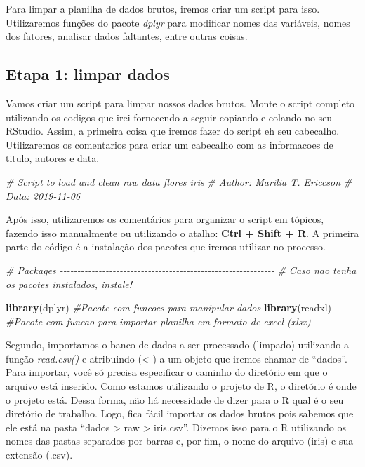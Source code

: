 \documentclass[
]{book}
\newenvironment{Shaded}{\begin{snugshade}}{\end{snugshade}}
\newcommand{\CommentTok}[1]{\textcolor[rgb]{0.56,0.35,0.01}{\textit{#1}}}
\newcommand{\FunctionTok}[1]{\textcolor[rgb]{0.13,0.29,0.53}{\textbf{#1}}}
\newcommand{\NormalTok}[1]{#1}
\begin{document}
Para limpar a planilha de dados brutos, iremos criar um script para isso. Utilizaremos funções do pacote \emph{dplyr} para modificar nomes das variáveis, nomes dos fatores, analisar dados faltantes, entre outras coisas.

\hypertarget{etapa-1-limpar-dados}{%
\subsection{Etapa 1: limpar dados}\label{etapa-1-limpar-dados}}

Vamos criar um script para limpar nossos dados brutos. Monte o script completo utilizando os codigos que irei fornecendo a seguir copiando e colando no seu RStudio. Assim, a primeira coisa que iremos fazer do script eh seu cabecalho. Utilizaremos os comentarios para criar um cabecalho com as informacoes de titulo, autores e data.

\begin{Shaded}
\begin{Highlighting}[]

\CommentTok{\# Script to load and clean raw data flores iris}
\CommentTok{\# Author: Marilia T. Ericcson}
\CommentTok{\# Data: 2019{-}11{-}06}
\end{Highlighting}
\end{Shaded}

Após isso, utilizaremos os comentários para organizar o script em tópicos, fazendo isso manualmente ou utilizando o atalho: \textbf{Ctrl + Shift + R}. A primeira parte do código é a instalação dos pacotes que iremos utilizar no processo.

\begin{Shaded}
\begin{Highlighting}[]

\CommentTok{\# Packages {-}{-}{-}{-}{-}{-}{-}{-}{-}{-}{-}{-}{-}{-}{-}{-}{-}{-}{-}{-}{-}{-}{-}{-}{-}{-}{-}{-}{-}{-}{-}{-}{-}{-}{-}{-}{-}{-}{-}{-}{-}{-}{-}{-}{-}{-}{-}{-}{-}{-}{-}{-}{-}{-}{-}{-}{-}{-}{-}{-}{-}}
\CommentTok{\# Caso nao tenha os pacotes instalados, instale!}

\FunctionTok{library}\NormalTok{(dplyr)  }\CommentTok{\#Pacote com funcoes para manipular dados}
\FunctionTok{library}\NormalTok{(readxl) }\CommentTok{\#Pacote com funcao para importar planilha em formato de excel (xlsx)}
\end{Highlighting}
\end{Shaded}

Segundo, importamos o banco de dados a ser processado (limpado) utilizando a função \emph{read.csv()} e atribuindo (\textless-) a um objeto que iremos chamar de ``dados''. Para importar, você só precisa especificar o caminho do diretório em que o arquivo está inserido. Como estamos utilizando o projeto de R, o diretório é onde o projeto está. Dessa forma, não há necessidade de dizer para o R qual é o seu diretório de trabalho. Logo, fica fácil importar os dados brutos pois sabemos que ele está na pasta ``dados \textgreater{} raw \textgreater{} iris.csv''. Dizemos isso para o R utilizando os nomes das pastas separados por barras e, por fim, o nome do arquivo (iris) e sua extensão (.csv).
\end{document}
